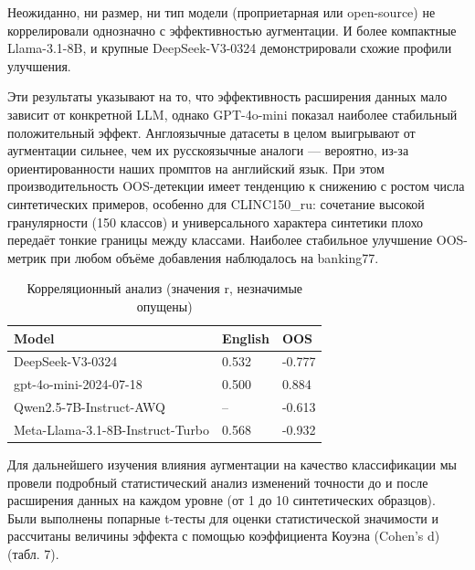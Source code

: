 \documentclass[14pt,a4paper,oneside,openany]{extbook}
\begin{document}
Неожиданно, ни размер, ни тип модели (проприетарная или open-source) не коррелировали однозначно с эффективностью аугментации. И более компактные Llama-3.1-8B, и крупные DeepSeek-V3-0324 демонстрировали схожие профили улучшения.

Эти результаты указывают на то, что эффективность расширения данных мало зависит от конкретной LLM, однако GPT-4o-mini показал наиболее стабильный положительный эффект. Англоязычные датасеты в целом выигрывают от аугментации сильнее, чем их русскоязычные аналоги — вероятно, из-за ориентированности наших промптов на английский язык. При этом производительность OOS-детекции имеет тенденцию к снижению с ростом числа синтетических примеров, особенно для CLINC150\_ru: сочетание высокой гранулярности (150 классов) и универсального характера синтетики плохо передаёт тонкие границы между классами. Наиболее стабильное улучшение OOS-метрик при любом объёме добавления наблюдалось на banking77.
\begin{table}[h!]
\caption{\label{tbl:corr_analisys}Корреляционный анализ (значения r, незначимые опущены)}
\centering
\begin{tabular}{|p{4cm}|p{2cm}|p{2cm}|}
\hline
Model & English & OOS\\
\hline
DeepSeek-V3-0324 & 0.532 & -0.777\\
\hline
gpt-4o-mini-2024-07-18 & 0.500 & 0.884\\
\hline
Qwen2.5-7B-Instruct-AWQ & – & -0.613\\
\hline
Meta-Llama-3.1-8B-Instruct-Turbo & 0.568 & -0.932\\
\hline
\end{tabular}
\end{table}

Для дальнейшего изучения влияния аугментации на качество классификации мы провели подробный статистический анализ изменений точности до и после расширения данных на каждом уровне (от 1 до 10 синтетических образцов). Были выполнены попарные t-тесты для оценки статистической значимости и рассчитаны величины эффекта с помощью коэффициента Коуэна (Cohen’s d) (табл. 7).
\end{document}
